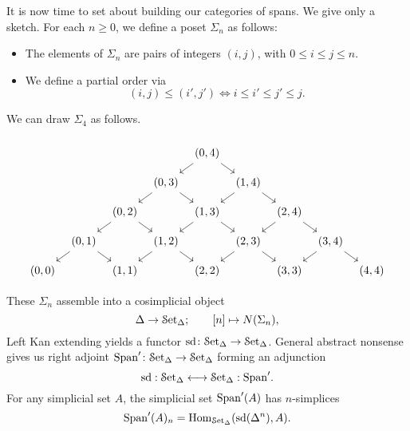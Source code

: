\documentclass[main.tex]{subfiles}
\begin{document}
It is now time to set about building our categories of spans. We give only a sketch. For each $n \geq 0$, we define a poset $\Sigma_{n}$ as follows:
\begin{itemize}
  \item The elements of $\Sigma_{n}$ are pairs of integers $(i, j)$, with $0 \leq i \leq j \leq n$.

  \item We define a partial order via 
    \begin{equation*}
      (i, j) \leq (i', j') \iff i \leq i' \leq j' \leq j.
    \end{equation*}
\end{itemize}

\begin{example}
  We can draw $\Sigma_{4}$ as follows.
  \begin{equation*}
    \begin{tikzcd}[column sep=tiny, row sep=small]
      \\
      &&&& {(0, 4)}
      \arrow[dl]
      \arrow[dr]
      \\
      &&& {(0, 3)}
      \arrow[dl]
      \arrow[dr]
      && {(1, 4)}
      \arrow[dl]
      \arrow[dr]
      \\
      && {(0, 2)}
      \arrow[dl]
      \arrow[dr]
      && {(1, 3)}
      \arrow[dl]
      \arrow[dr]
      && {(2, 4)}
      \arrow[dl]
      \arrow[dr]
      \\
      & {(0, 1)}
      \arrow[dl]
      \arrow[dr]
      && {(1, 2)}
      \arrow[dl]
      \arrow[dr]
      && {(2, 3)}
      \arrow[dl]
      \arrow[dr]
      && {(3, 4)}
      \arrow[dl]
      \arrow[dr]
      \\
      {(0, 0)}
      && {(1, 1)}
      && {(2, 2)}
      && {(3, 3)}
      && {(4, 4)}
    \end{tikzcd}
  \end{equation*}
\end{example}

These $\Sigma_{n}$ assemble into a cosimplicial object 
\begin{equation*}
  \Delta \to \mathcal{S}\mathrm{et}_{\Delta};\qquad [n] \mapsto N(\Sigma_{n}),
\end{equation*}
Left Kan extending yields a functor $\mathrm{sd}\colon \mathcal{S}\mathrm{et}_{\Delta} \to \mathcal{S}\mathrm{et}_{\Delta}$. General abstract nonsense gives us right adjoint $\mathrm{Span}'\colon \mathcal{S}\mathrm{et}_{\Delta} \to \mathcal{S}\mathrm{et}_{\Delta}$ forming an adjunction
\begin{equation*}
  \mathrm{sd}: \mathcal{S}\mathrm{et}_{\Delta} \longleftrightarrow \mathcal{S}\mathrm{et}_{\Delta} : \mathrm{Span}'.
\end{equation*}
For any simplicial set $A$, the simplicial set $\mathrm{Span}'(A)$ has $n$-simplices
\begin{equation*}
  \mathrm{Span}'(A)_{n} = \mathrm{Hom}_{\mathcal{S}\mathrm{et}_{\Delta}}(\mathrm{sd}(\Delta^{n}), A).
\end{equation*}
\end{document}
